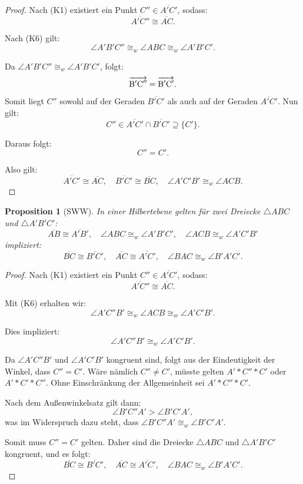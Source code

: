 \documentclass[a4paper,12pt]{article}
\theoremstyle{break}
\newtheorem{proposition}[definition]{Proposition}
\begin{document}
\begin{proof}
Nach (K1) existiert ein Punkt \(C'' \in \overline{A'C'}\), sodass:
\[
\overline{A'C''} \cong \overline{AC}.
\]

Nach (K6) gilt:
\[
\angle A'B'C'' \cong_w \angle ABC \cong_w \angle A'B'C'.
\]

Da \(\angle A'B'C'' \cong_w \angle A'B'C'\), folgt:
\[
\overrightarrow{\rm B'C''} = \overrightarrow{\rm B'C'}.
\]

Somit liegt \(C''\) sowohl auf der Geraden \(\overline{B'C'}\) als auch auf der Geraden \(\overline{A'C'}\). Nun gilt:
\[
C'' \in \overline{A'C'} \cap \overline{B'C'} \supseteq \{C'\}.
\]

Daraus folgt:
\[
C'' = C'.
\]

Also gilt:
\[
\overline{A'C'} \cong \overline{AC}, \quad \overline{B'C'} \cong \overline{BC}, \quad \angle A'C'B' \cong_w \angle ACB.
\]
\end{proof}

\begin{proposition}[SWW]
In einer Hilbertebene gelten für zwei Dreiecke \(\triangle ABC\) und \(\triangle A'B'C'\):
\[
\overline{AB} \cong \overline{A'B'}, \quad \angle ABC \cong_w \angle A'B'C', \quad \angle ACB \cong_w \angle A'C'B'
\]
impliziert:
\[
\overline{BC} \cong \overline{B'C'}, \quad \overline{AC} \cong \overline{A'C'}, \quad \angle BAC \cong_w \angle B'A'C'.
\]
\end{proposition}

\begin{proof}
Nach (K1) existiert ein Punkt \(C'' \in \overline{A'C'}\), sodass:
\[
\overline{A'C''} \cong \overline{AC}.
\]

Mit (K6) erhalten wir:
\[
\angle A'C''B' \cong_w \angle ACB \cong_w \angle A'C'B'.
\]

Dies impliziert:
\[
\angle A'C''B' \cong_w \angle A'C'B'.
\]

Da \(\angle A'C''B'\) und \(\angle A'C'B'\) kongruent sind, folgt aus der Eindeutigkeit der Winkel, dass \(C'' = C'\). Wäre nämlich \(C'' \neq C'\), müsste gelten \(A' * C'' * C'\) oder \(A' * C' * C''\). Ohne Einschränkung der Allgemeinheit sei \(A' * C'' * C'\).

Nach dem Außenwinkelsatz gilt dann:
\[
\angle B'C''A' > \angle B'C'A',
\]
was im Widerspruch dazu steht, dass \(\angle B'C''A' \cong_w \angle B'C'A'\). 

Somit muss \(C'' = C'\) gelten. Daher sind die Dreiecke \(\triangle ABC\) und \(\triangle A'B'C'\) kongruent, und es folgt:
\[
\overline{BC} \cong \overline{B'C'}, \quad \overline{AC} \cong \overline{A'C'}, \quad \angle BAC \cong_w \angle B'A'C'.
\]
\end{proof}
\end{document}
